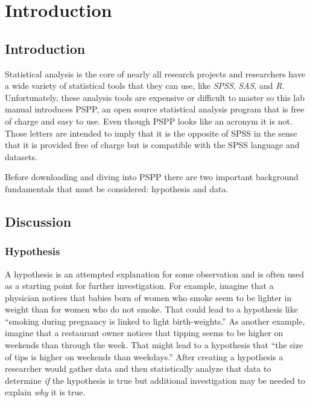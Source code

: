 \chapter{Introduction}\label{int:introduction}

\section{Introduction}

Statistical analysis is the core of nearly all research projects and researchers have a wide variety of statistical tools that they can use, like \textit{SPSS}, \textit{SAS}, and \textit{R}. Unfortunately, these analysis tools are expensive or difficult to master so this lab manual introduces \acs{PSPP}, an open source statistical analysis program that is free of charge and easy to use. Even though \acs{PSPP} looks like an acronym it is not. Those letters are intended to imply that it is the opposite of \acs{SPSS} in the sense that it is provided free of charge but is compatible with the \acs{SPSS} language and datasets.

Before downloading and diving into \acs{PSPP} there are two important background fundamentals that must be considered: hypothesis and data.

\section{Discussion}

\subsection{Hypothesis}\label{intro:Hypothesis}

A hypothesis is an attempted explanation for some observation and is often used as a starting point for further investigation. For example, imagine that a physician notices that babies born of women who smoke seem to be lighter in weight than for women who do not smoke. That could lead to a hypothesis like ``smoking during pregnancy is linked to light birth-weights.'' As another example, imagine that a restaurant owner notices that tipping seems to be higher on weekends than through the week. That might lead to a hypothesis that ``the size of tips is higher on weekends than weekdays.'' After creating a hypothesis a researcher would gather data and then statistically analyze that data to determine \textit{if} the hypothesis is true but additional investigation may be needed to explain \textit{why} it is true.

